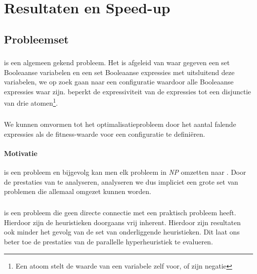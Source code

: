 \chapter{Resultaten en Speed-up}
\label{hoofdstuk:4}



\section{Probleemset}

\subsection{}

 is een algemeen gekend probleem. Het is afgeleid van  waar gegeven een set Booleaanse variabelen en een set Booleaanse expressies met uitsluitend deze variabelen, we op zoek gaan naar een configuratie waardoor alle Booleaanse expressies waar zijn.  beperkt de expressiviteit van de expressies tot een disjunctie van drie atomen\footnote{Een atoom stelt de waarde van een variabele zelf voor, of zijn negatie}.

\paragraph{}
We kunnen  omvormen tot het optimalisatieprobleem  door het aantal falende expressies als de fitness-waarde voor een configuratie te defini\"eren.

\subsubsection{Motivatie}

 is een  probleem en bijgevolg kan men elk probleem in \emph{NP} omzetten naar . Door de prestaties van  te analyseren, analyseren we dus impliciet een grote set van problemen die allemaal omgezet kunnen worden.

\paragraph{}
 is een probleem die geen directe connectie met een praktisch probleem heeft. Hierdoor zijn de heuristieken doorgaans vrij inherent. Hierdoor zijn resultaten ook minder het gevolg van de set van onderliggende heuristieken. Dit laat ons beter toe de prestaties van de parallelle hyperheuristiek te evalueren.

